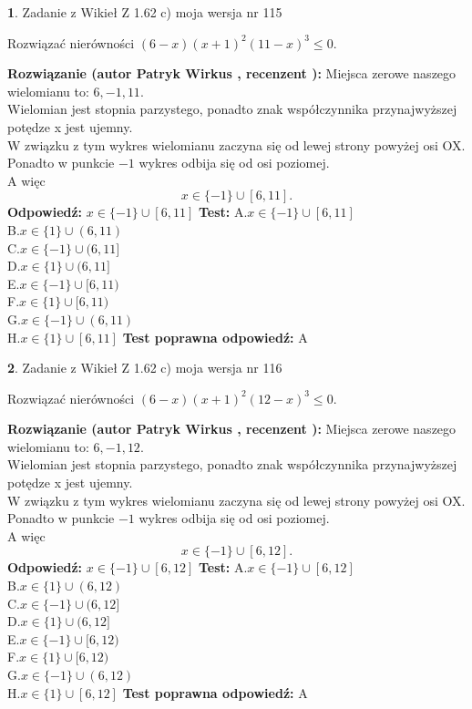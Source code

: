 \documentclass[12pt, a4paper]{article}
\theoremstyle{definition} %
\newtheorem{zad}{}
\newcommand{\zadStart}[1]{\begin{zad}#1\newline}
\newcommand{\zadStop}{\end{zad}}
\newcommand{\rozwStart}[2]{\noindent \textbf{Rozwiązanie (autor #1 , recenzent #2): }\newline}
\newcommand{\rozwStop}{\newline}
\newcommand{\odpStart}{\noindent \textbf{Odpowiedź:}\newline}
\newcommand{\odpStop}{\newline}
\newcommand{\testStart}{\noindent \textbf{Test:}\newline}
\newcommand{\testStop}{\newline}
\newcommand{\kluczStart}{\noindent \textbf{Test poprawna odpowiedź:}\newline}
\newcommand{\kluczStop}{\newline}
\begin{document}
\zadStart{Zadanie z Wikieł Z 1.62 c) moja wersja nr 115}

Rozwiązać nierówności $(6-x)(x+1)^{2}(11-x)^{3}\le0$.
\zadStop
\rozwStart{Patryk Wirkus}{}
Miejsca zerowe naszego wielomianu to: $6, -1, 11$.\\
Wielomian jest stopnia parzystego, ponadto znak współczynnika przy\linebreak najwyższej potędze x jest ujemny.\\ W związku z tym wykres wielomianu zaczyna się od lewej strony powyżej osi OX.\\
Ponadto w punkcie $-1$ wykres odbija się od osi poziomej.\\
A więc $$x \in \{-1\} \cup [6,11].$$
\rozwStop
\odpStart
$x \in \{-1\} \cup [6,11]$
\odpStop
\testStart
A.$x \in \{-1\} \cup [6,11]$\\
B.$x \in \{1\} \cup (6,11)$\\
C.$x \in \{-1\} \cup (6,11]$\\
D.$x \in \{1\} \cup (6,11]$\\
E.$x \in \{-1\} \cup [6,11)$\\
F.$x \in \{1\} \cup [6,11)$\\
G.$x \in \{-1\} \cup (6,11)$\\
H.$x \in \{1\} \cup [6,11]$
\testStop
\kluczStart
A
\kluczStop



\zadStart{Zadanie z Wikieł Z 1.62 c) moja wersja nr 116}

Rozwiązać nierówności $(6-x)(x+1)^{2}(12-x)^{3}\le0$.
\zadStop
\rozwStart{Patryk Wirkus}{}
Miejsca zerowe naszego wielomianu to: $6, -1, 12$.\\
Wielomian jest stopnia parzystego, ponadto znak współczynnika przy\linebreak najwyższej potędze x jest ujemny.\\ W związku z tym wykres wielomianu zaczyna się od lewej strony powyżej osi OX.\\
Ponadto w punkcie $-1$ wykres odbija się od osi poziomej.\\
A więc $$x \in \{-1\} \cup [6,12].$$
\rozwStop
\odpStart
$x \in \{-1\} \cup [6,12]$
\odpStop
\testStart
A.$x \in \{-1\} \cup [6,12]$\\
B.$x \in \{1\} \cup (6,12)$\\
C.$x \in \{-1\} \cup (6,12]$\\
D.$x \in \{1\} \cup (6,12]$\\
E.$x \in \{-1\} \cup [6,12)$\\
F.$x \in \{1\} \cup [6,12)$\\
G.$x \in \{-1\} \cup (6,12)$\\
H.$x \in \{1\} \cup [6,12]$
\testStop
\kluczStart
A
\kluczStop
\end{document}
